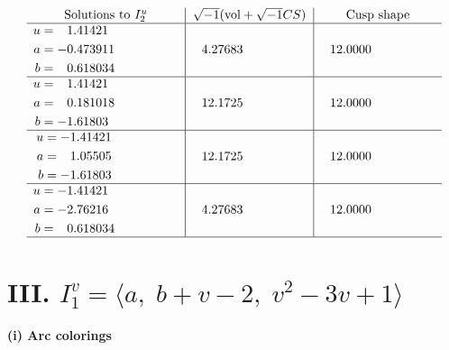\documentclass[1p]{elsarticle_modified}
\theoremstyle{definition}
\newcommand{\I}{\sqrt{-1}}
\begin{document}
$$\begin{array}{c|c|c}  
\text{Solutions to }I^u_{2}& \I (\text{vol} + \sqrt{-1}CS) & \text{Cusp shape}\\
 \hline 
\begin{aligned}
u &= \phantom{-}1.41421\phantom{ +0.000000I} \\
a &= -0.473911\phantom{ +0.000000I} \\
b &= \phantom{-}0.618034\phantom{ +0.000000I}\end{aligned}
 & \phantom{-}4.27683\phantom{ +0.000000I} & \phantom{-}12.0000\phantom{ +0.000000I} \\ \hline\begin{aligned}
u &= \phantom{-}1.41421\phantom{ +0.000000I} \\
a &= \phantom{-}0.181018\phantom{ +0.000000I} \\
b &= -1.61803\phantom{ +0.000000I}\end{aligned}
 & \phantom{-}12.1725\phantom{ +0.000000I} & \phantom{-}12.0000\phantom{ +0.000000I} \\ \hline\begin{aligned}
u &= -1.41421\phantom{ +0.000000I} \\
a &= \phantom{-}1.05505\phantom{ +0.000000I} \\
b &= -1.61803\phantom{ +0.000000I}\end{aligned}
 & \phantom{-}12.1725\phantom{ +0.000000I} & \phantom{-}12.0000\phantom{ +0.000000I} \\ \hline\begin{aligned}
u &= -1.41421\phantom{ +0.000000I} \\
a &= -2.76216\phantom{ +0.000000I} \\
b &= \phantom{-}0.618034\phantom{ +0.000000I}\end{aligned}
 & \phantom{-}4.27683\phantom{ +0.000000I} & \phantom{-}12.0000\phantom{ +0.000000I}\\
 \hline 
 \end{array}$$\newpage\newpage\renewcommand{\arraystretch}{1}
\centering \section*{III. $I^v_{1}= \langle a,\;b+v-2,\;v^2-3 v+1 \rangle$}
\flushleft \textbf{(i) Arc colorings}\\
\end{document}
